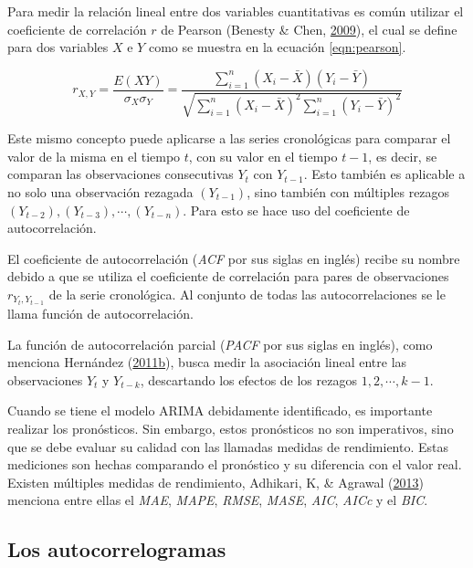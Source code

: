 \documentclass[
]{article}
\begin{document}
Para medir la relación lineal entre dos variables cuantitativas es común
utilizar el coeficiente de correlación \(r\) de Pearson (Benesty \&
Chen, \protect\hyperlink{ref-pearson}{2009}), el cual se define para dos
variables \(X\) e \(Y\) como se muestra en la ecuación
\ref{eqn:pearson}.

\begin{equation}
\label{eqn:pearson}
r_{X,Y}=\frac{E(XY)}{\sigma_X \sigma_Y} = \frac{\sum_{i=1}^n \left(X_i- \bar X\right) \left(Y_i- \bar Y\right)}{\sqrt{\sum_{i=1}^n \left(X_i- \bar X\right)^2 \sum_{i=1}^n \left(Y_i- \bar Y\right)^2}}
\end{equation}

Este mismo concepto puede aplicarse a las series cronológicas para
comparar el valor de la misma en el tiempo \(t\), con su valor en el
tiempo \(t-1\), es decir, se comparan las observaciones consecutivas
\(Y_t\) con \(Y_{t-1}\). Esto también es aplicable a no solo una
observación rezagada \((Y_{t-1})\), sino también con múltiples rezagos
\((Y_{t-2}), (Y_{t-3}), \cdots,(Y_{t-n})\). Para esto se hace uso del
coeficiente de autocorrelación.

El coeficiente de autocorrelación (\emph{ACF} por sus siglas en inglés)
recibe su nombre debido a que se utiliza el coeficiente de correlación
para pares de observaciones \(r_{Y_t, Y_{t-1}}\) de la serie
cronológica. Al conjunto de todas las autocorrelaciones se le llama
función de autocorrelación.

La función de autocorrelación parcial (\emph{PACF} por sus siglas en
inglés), como menciona Hernández
(\protect\hyperlink{ref-oscarh-4}{2011}\protect\hyperlink{ref-oscarh-4}{b}),
busca medir la asociación lineal entre las observaciones \(Y_t\) y
\(Y_{t-k}\), descartando los efectos de los rezagos
\(1,2, \cdots ,k-1\).

Cuando se tiene el modelo ARIMA debidamente identificado, es importante
realizar los pronósticos. Sin embargo, estos pronósticos no son
imperativos, sino que se debe evaluar su calidad con las llamadas
medidas de rendimiento. Estas mediciones son hechas comparando el
pronóstico y su diferencia con el valor real. Existen múltiples medidas
de rendimiento, Adhikari, K, \& Agrawal
(\protect\hyperlink{ref-medidas}{2013}) menciona entre ellas el
\emph{MAE}, \emph{MAPE}, \emph{RMSE}, \emph{MASE}, \emph{AIC},
\emph{AICc} y el \emph{BIC}.

\subsection{Los autocorrelogramas}
\end{document}
